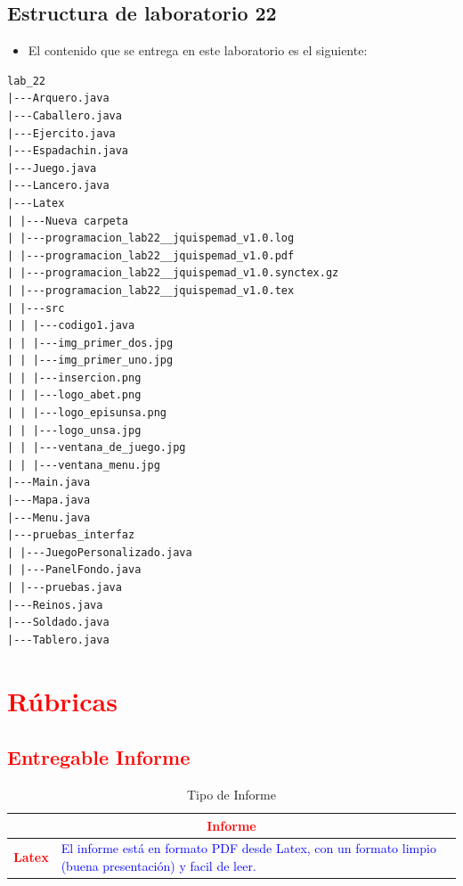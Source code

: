 \documentclass{article}
\begin{document}
	\subsection{Estructura de laboratorio 22}
	\begin{itemize}	
		\item El contenido que se entrega en este laboratorio es el siguiente:
	\end{itemize}
	
\begin{lstlisting}[style=ascii-tree]
lab_22
|---Arquero.java
|---Caballero.java
|---Ejercito.java
|---Espadachin.java
|---Juego.java
|---Lancero.java
|---Latex
| |---Nueva carpeta
| |---programacion_lab22__jquispemad_v1.0.log
| |---programacion_lab22__jquispemad_v1.0.pdf
| |---programacion_lab22__jquispemad_v1.0.synctex.gz
| |---programacion_lab22__jquispemad_v1.0.tex
| |---src
| | |---codigo1.java
| | |---img_primer_dos.jpg
| | |---img_primer_uno.jpg
| | |---insercion.png
| | |---logo_abet.png
| | |---logo_episunsa.png
| | |---logo_unsa.jpg
| | |---ventana_de_juego.jpg
| | |---ventana_menu.jpg
|---Main.java
|---Mapa.java
|---Menu.java
|---pruebas_interfaz
| |---JuegoPersonalizado.java
| |---PanelFondo.java
| |---pruebas.java
|---Reinos.java
|---Soldado.java
|---Tablero.java

\end{lstlisting}    


	\section{\textcolor{red}{Rúbricas}}
	
	\subsection{\textcolor{red}{Entregable Informe}}
	\begin{table}[H]
		\caption{Tipo de Informe}
		\setlength{\tabcolsep}{0.5em} %
		{\renewcommand{\arraystretch}{1.5}%
		\begin{tabular}{|p{3cm}|p{12cm}|}
			\hline
			\multicolumn{2}{|c|}{\textbf{\textcolor{red}{Informe}}}  \\
			\hline 
			\textbf{\textcolor{red}{Latex}} & \textcolor{blue}{El informe está en formato PDF desde Latex,  con un formato limpio (buena presentación) y facil de leer.}   \\ 
			\hline 
			
			
		\end{tabular}
	}
	\end{table}
	
\end{document}
